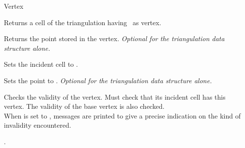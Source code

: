 \begin{ccRefConcept}[TriangulationDataStructure_3::]{Vertex}
\ccAccessFunctions

{Returns a cell of the triangulation having \ccVar\ as vertex.}

{Returns the point stored in the vertex.
{\textit{Optional for the triangulation data structure alone.}}}


{Sets the incident cell to .}

{Sets the point to . {\textit{Optional for the
triangulation data structure alone.}}}

\begin{ccDebug}

{Checks the validity of the vertex. Must check that its incident cell
has this vertex. The validity of the base vertex is also checked.\\
When  is set to , messages are printed to give
a precise indication on the kind of invalidity encountered.}
\end{ccDebug}

\ccSeeAlso

.

\end{ccRefConcept}


